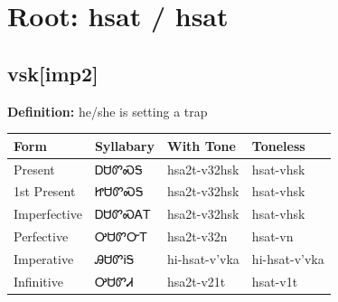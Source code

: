 \documentclass{article}%
\begin{document}
%
\normalsize%
\section*{Root: hsat / hsat}%
\subsection*{vsk[imp2]}%
\textbf{Definition: }%
he/she is setting a trap%
\\[0.5em]%
\begin{tabular}{|l|l|l|l|}%
\hline%
\textbf{Form}&\textbf{Syllabary}&\textbf{With Tone}&\textbf{Toneless}\\%
\hline%
Present&ᎠᏌᏛᏍᎦ&hsa2t{-}v32hsk&hsat{-}vhsk\\%
1st Present&ᏥᏌᏛᏍᎦ&hsa2t{-}v32hsk&hsat{-}vhsk\\%
Imperfective&ᎠᏌᏛᏍᎪᎢ&hsa2t{-}v32hsk&hsat{-}vhsk\\%
Perfective&ᎤᏌᏛᏅᎢ&hsa2t{-}v32n&hsat{-}vn\\%
Imperative&ᎯᏌᏛᎥᎦ&hi{-}hsat{-}v'vka&hi{-}hsat{-}v'vka\\%
Infinitive&ᎤᏌᏛᏗ&hsa2t{-}v21t&hsat{-}v1t\\%
\hline%
\end{tabular}%
\\[1em]%
\end{document}
